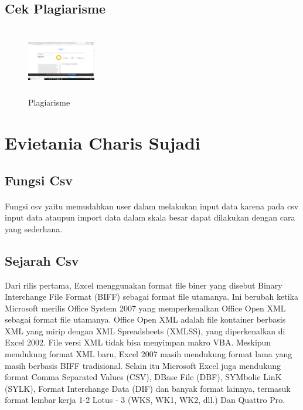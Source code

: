 \subsection{Cek Plagiarisme}
\begin{figure}[!htbp]
\centering
\includegraphics[width=3cm,height=3cm]{figures/dezha/noplagiat.PNG}
\caption{Plagiarisme}
\label{plagiarisme}\end{figure}
\section{Evietania Charis Sujadi}
\subsection{Fungsi Csv}
\paragraph{}Fungsi csv yaitu memudahkan user dalam melakukan input data karena pada csv input data ataupun import data dalam skala besar dapat dilakukan dengan cara yang sederhana.
\subsection{Sejarah Csv}  Dari rilis pertama, Excel menggunakan format file biner yang disebut Binary Interchange File Format (BIFF) sebagai format file utamanya. Ini berubah ketika Microsoft merilis Office System 2007 yang memperkenalkan Office Open XML sebagai format file utamanya. Office Open XML adalah file kontainer berbasis XML yang mirip dengan XML Spreadsheets (XMLSS), yang diperkenalkan di Excel 2002. File versi XML tidak bisa menyimpan makro VBA. Meskipun mendukung format XML baru, Excel 2007 masih mendukung format lama yang masih berbasis BIFF tradisional. Selain itu Microsoft Excel juga mendukung format Comma Separated Values (CSV), DBase File (DBF), SYMbolic LinK (SYLK), Format Interchange Data (DIF) dan banyak format lainnya, termasuk format lembar kerja 1-2 Lotus - 3 (WKS, WK1, WK2, dll.) Dan Quattro Pro.

